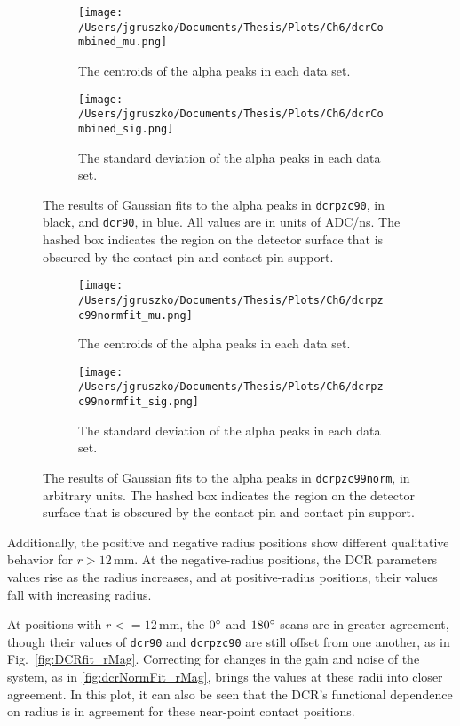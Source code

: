 \begin{figure*}[]
 \centering
  \begin{subfigure}[t]{.45\textwidth}
 \texttt{[image: /Users/jgruszko/Documents/Thesis/Plots/Ch6/dcrCombined\_mu.png]}
 \caption{The centroids of the alpha peaks in each data set.} 
 \label{fig:DCRfit_mu}
\end{subfigure}
\hfill
\begin{subfigure}[t]{.45\textwidth}
 \texttt{[image: /Users/jgruszko/Documents/Thesis/Plots/Ch6/dcrCombined\_sig.png]}
 \caption{The standard deviation of the alpha peaks in each data set.} 
 \label{fig:DCRfit_sig}
 \end{subfigure}
 \caption[The results of Gaussian fits to the alpha peaks in {\tt dcrpzc90} and {\tt dcr90}]{The results of Gaussian fits to the alpha peaks in {\tt dcrpzc90}, in black, and {\tt dcr90}, in blue. All values are in units of ADC/ns. The hashed box indicates the region on the detector surface that is obscured by the contact pin and contact pin support.}
  \label{fig:DCRfit}
  
   \centering
  \begin{subfigure}[t]{.45\textwidth}
 \texttt{[image: /Users/jgruszko/Documents/Thesis/Plots/Ch6/dcrpzc99normfit\_mu.png]}
 \caption{The centroids of the alpha peaks in each data set.} 
 \label{fig:dcrNormfit_mu}
\end{subfigure}
\hfill
\begin{subfigure}[t]{.45\textwidth}
 \texttt{[image: /Users/jgruszko/Documents/Thesis/Plots/Ch6/dcrpzc99normfit\_sig.png]}
 \caption{The standard deviation of the alpha peaks in each data set.} 
 \label{fig:dcrNormfit_sig}
 \end{subfigure}
  \caption[The results of Gaussian fits to the alpha peaks in {\tt dcrpzc99norm}]{The results of Gaussian fits to the alpha peaks in {\tt dcrpzc99norm}, in arbitrary units. The hashed box indicates the region on the detector surface that is obscured by the contact pin and contact pin support.}
  \label{fig:dcrNormFit}
\end{figure*}

Additionally, the positive and negative radius positions show different qualitative behavior for $r>12$\,mm. At the negative-radius positions, the DCR parameters values rise as the radius increases, and at positive-radius positions, their values fall with increasing radius. 

At positions with $r<= 12$\,mm, the $0\degree$ and $180\degree$ scans are in greater agreement, though their values of {\tt dcr90} and {\tt dcrpzc90} are still offset from one another, as in Fig.~\ref{fig:DCRfit_rMag}. Correcting for changes in the gain and noise of the system, as in \ref{fig:dcrNormFit_rMag}, brings the values at these radii into closer agreement. In this plot, it can also be seen that the DCR's functional dependence on radius is in agreement for these near-point contact positions. 

